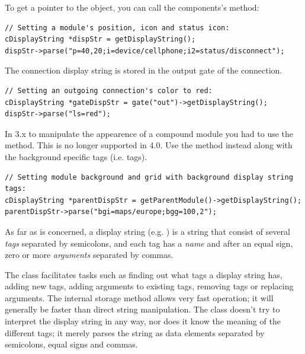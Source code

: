 To get a pointer to the  object, you can call
the components's  method:

\begin{verbatim}
// Setting a module's position, icon and status icon:
cDisplayString *dispStr = getDisplayString();
dispStr->parse("p=40,20;i=device/cellphone;i2=status/disconnect");
\end{verbatim}

\begin{note}
The connection display string is stored in the output gate of the connection.
\end{note}

\begin{verbatim}
// Setting an outgoing connection's color to red:
cDisplayString *gateDispStr = gate("out")->getDisplayString();
dispStr->parse("ls=red");
\end{verbatim}

\begin{note}
In {\opp} 3.x to manipulate the appearence of a compound module you had to use
the  method. This is no longer supported in
{\opp} 4.0. Use the  method instead along with the background
specific tags (i.e.  tags).
\end{note}

\begin{verbatim}
// Setting module background and grid with background display string tags:
cDisplayString *parentDispStr = getParentModule()->getDisplayString();
parentDispStr->parse("bgi=maps/europe;bgg=100,2");
\end{verbatim}

As far as  is concerned, a display string
(e.g. ) is a string that consist of several
\textit{tags} separated by semicolons, and each tag has a \textit{name}
and after an equal sign, zero or more \textit{arguments} separated by commas.

The class facilitates tasks such as finding out what tags a display string
has, adding new tags, adding arguments to existing tags,
removing tags or replacing arguments. The internal storage method allows
very fast operation; it will generally be faster than direct string manipulation.
The class doesn't try to interpret the display string in any way, nor does
it know the meaning of the different tags; it merely parses the string
as data elements separated by semicolons, equal signs and commas.

